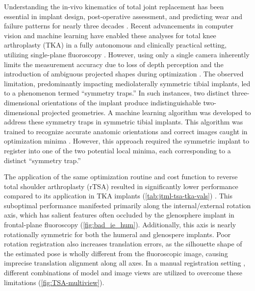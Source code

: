 Understanding the in-vivo kinematics of total joint replacement has been essential in implant design, post-operative assessment, and predicting wear and failure patterns for nearly three decades \cite{freglyComputationalWearPrediction2005,banks2003HapPaul2004,banksRationaleResultsFixedBearing2019}.
Recent advancements in computer vision and machine learning have enabled these analyses for total knee arthroplasty (TKA) in a fully autonomous and clinically practical setting, utilizing single-plane fluoroscopy \cite{brobergValidationMachineLearning2023,jensenJointTrackMachine2023}.
However, using only a single camera inherently limits the measurement accuracy due to loss of depth perception and the introduction of ambiguous projected shapes during optimization \cite{floodAutomatedRegistration3D2018,mahfouzRobustMethodRegistration2003,zuffiModelbasedMethodReconstruction1999,banksAccurateMeasurementThreedimensional1996}.
The observed limitation, predominantly impacting mediolaterally symmetric tibial implants, led to a phenomenon termed “symmetry traps.”
In such instances, two distinct three-dimensional orientations of the implant produce indistinguishable two-dimensional projected geometries.
A machine learning algorithm was developed to address these symmetry traps in symmetric tibial implants.
This algorithm was trained to recognize accurate anatomic orientations and correct images caught in optimization minima \cite{jensenCorrectingSymmetricImplantInReview}.
However, this approach required the symmetric implant to register into one of the two potential local minima, each corresponding to a distinct “symmetry trap.”

The application of the same optimization routine and cost function \cite{floodAutomatedRegistration3D2018,jensenJointTrackMachine2023} to reverse total shoulder arthroplasty (rTSA) resulted in significantly lower performance compared to its application in TKA implants (\cref{tab:jtml-tsa-tka-vals}) \cite{jensenJointTrackMachine2023}.
This suboptimal performance manifested primarily along the internal/external rotation axis, which has salient features often occluded by the glenosphere implant in frontal-plane fluoroscopy (\cref{fig:bad_ie_hum}).
Additionally, this axis is nearly rotationally symmetric for both the humeral and glenospere implants.
Poor rotation registration also increases translation errors, as the silhouette shape of the estimated pose is wholly different from the fluoroscopic image, causing imprecise translation alignment along all axes.
In a manual registration setting \cite{muJointTrackOpenSourceEasily2007}, different combinations of model and image views are utilized to overcome these limitations (\cref{fig:TSA-multiview}).


